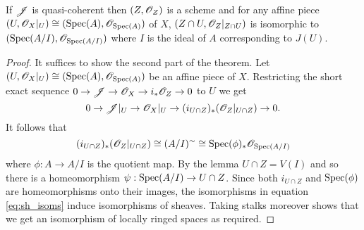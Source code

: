 \documentclass{memoir}
\begin{document}
\begin{thm}
    \label{thm:sheaf_of_ideals}
    If $\mathscr{J}$ is quasi-coherent then $(Z,\mathscr{O}_Z)$ is a scheme and for any affine piece $(U,\mathscr{O}_X|_U) \cong (\operatorname{Spec}(A),\mathscr{O}_{\operatorname{Spec}(A)})$ of $X$, $(Z\cap U,\mathscr{O}_Z|_{Z\cap U})$ is isomorphic to $(\operatorname{Spec}(A/I),\mathscr{O}_{\operatorname{Spec}(A/I)})$ where $I$ is the ideal of $A$ corresponding to $J(U)$.
\end{thm}
\begin{proof}
    It suffices to show the second part of the theorem.
    Let $(U,\mathscr{O}_X|_U) \cong (\operatorname{Spec}(A),\mathscr{O}_{\operatorname{Spec}(A)})$ be an affine piece of $X$.
    Restricting the short exact sequence $0\to\mathscr{J}\to\mathscr{O}_X\to i_*\mathscr{O}_Z\to 0$ to $U$ we get
    \begin{equation}
        0\to\mathscr{J}|_U \to\mathscr{O}_X|_U \to (i_{U\cap Z})_*(\mathscr{O}_Z|_{U\cap Z})\to 0.
    \end{equation}
    It follows that 
    \begin{equation}
        \label{eq:sh_isoms}
        (i_{U\cap Z})_*(\mathscr{O}_Z|_{U\cap Z}) \cong (A/I)^\sim \cong \operatorname{Spec}(\phi)_*\mathscr{O}_{\operatorname{Spec}(A/I)}
    \end{equation}
    where $\phi:A\to A/I$ is the quotient map.
    By the lemma $U\cap Z = V(I)$ and so there is a homeomorphism $\psi:\operatorname{Spec}(A/I)\to U\cap Z$.
    Since both $i_{U\cap Z}$ and $\operatorname{Spec}(\phi)$ are homeomorphisms onto their images, the isomorphisms in equation \ref{eq:sh_isoms} induce isomorphisms of sheaves.
    Taking stalks moreover shows that we get an isomorphism of locally ringed spaces as required.
\end{proof}
\end{document}
